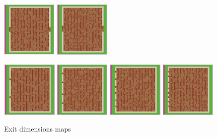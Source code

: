 \documentclass[12pt,letterpaper]{article}
\begin{document}
\begin{figure}[!ht]
\begin{minipage}[b]{.75\linewidth}
    \includegraphics[width=0.24\textwidth]{./figures/exit_dims_6_b.png}
    \includegraphics[width=0.24\textwidth]{./figures/exit_dims_8_b.png}
  \end{minipage}
  \begin{minipage}[b]{.75\linewidth}
    \includegraphics[width=0.24\textwidth]{./figures/exit_dims_2_c.png}
    \includegraphics[width=0.24\textwidth]{./figures/exit_dims_4_c.png}
    \includegraphics[width=0.24\textwidth]{./figures/exit_dims_6_c.png}
    \includegraphics[width=0.24\textwidth]{./figures/exit_dims_8_c.png}
  \end{minipage}

  \caption{Exit dimensions maps}
  \label{exitdimsmaps}
\end{figure}
\end{document}
